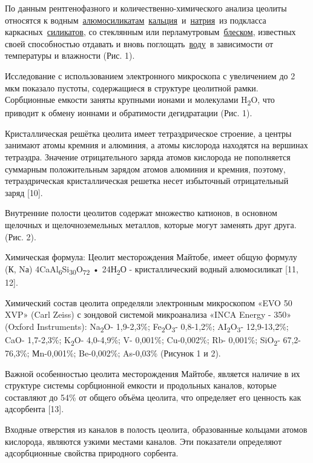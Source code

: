 \begin{multicols}{2}
По данным рентгенофазного и количественно-химического анализа цеолиты
относятся к
водным~\href{https://ru.wikipedia.org/wiki/\%D0\%90\%D0\%BB\%D1\%8E\%D0\%BC\%D0\%BE\%D1\%81\%D0\%B8\%D0\%BB\%D0\%B8\%D0\%BA\%D0\%B0\%D1\%82\%D1\%8B}{алюмосиликатам}~\href{https://ru.wikipedia.org/wiki/\%D0\%9A\%D0\%B0\%D0\%BB\%D1\%8C\%D1\%86\%D0\%B8\%D0\%B9}{кальция}~и~\href{https://ru.wikipedia.org/wiki/\%D0\%9D\%D0\%B0\%D1\%82\%D1\%80\%D0\%B8\%D0\%B9}{натрия}~из
подкласса
каркасных~\href{https://ru.wikipedia.org/wiki/\%D0\%A1\%D0\%B8\%D0\%BB\%D0\%B8\%D0\%BA\%D0\%B0\%D1\%82\%D1\%8B_(\%D0\%BC\%D0\%B8\%D0\%BD\%D0\%B5\%D1\%80\%D0\%B0\%D0\%BB\%D1\%8B)}{силикатов},
со стеклянным или
перламутровым~\href{https://ru.wikipedia.org/wiki/\%D0\%91\%D0\%BB\%D0\%B5\%D1\%81\%D0\%BA}{блеском},
известных своей способностью отдавать и вновь
поглощать~\href{https://ru.wikipedia.org/wiki/\%D0\%92\%D0\%BE\%D0\%B4\%D0\%B0}{воду}~в
зависимости от температуры и влажности (Рис. 1).

Исследование с использованием электронного микроскопа с увеличением до 2
мкм показало пустоты, содержащиеся в структуре цеолитной рамки.
Сорбционные емкости заняты крупными ионами и молекулами
H\textsubscript{2}O, что приводит к обмену ионнами и обратимости
дегидратации (Рис. 1).

Кристаллическая решётка цеолита имеет тетраэдрическое строение, а центры
занимают атомы кремния и алюминия, а атомы кислорода находятся на
вершинах тетраэдра. Значение отрицательного заряда атомов кислорода не
пополняется суммарным положительным зарядом атомов алюминия и кремния,
поэтому, тетраэдрическая кристаллическая решетка несет избыточный
отрицательный заряд {[}10{]}.

Внутренние полости цеолитов содержат множество катионов, в основном
щелочных и щелочноземельных металлов, которые могут заменять друг друга.
(Рис. 2).

Химическая формула: Цеолит месторождения Майтобе, имеет общую формулу
(К, Nа) 4CaAl\textsubscript{6}Si\textsubscript{30}O\textsubscript{72} •
24Н\textsubscript{2}О - кристаллический водный алюмосиликат {[}11,
12{]}.

Химический состав цеолита определяли электронным микроскопом «EVO 50
XVP» (Carl Zeiss) с зондовой системой микроанализа «INCA Energy - 350»
(Oxford Instruments): Na\textsubscript{2}O- 1,9-2,3\%;
Fe\textsubscript{2}O\textsubscript{3}- 0,8-1,2\%;
AI\textsubscript{2}O\textsubscript{3}- 12,9-13,2\%; CaO- 1,7-2,3\%;
K\textsubscript{2}O- 4,0-4,9\%; V- 0,001\%; Cu-0,002\%; Rb- 0,001\%;
SiO\textsubscript{2}- 67,2-76,3\%; Мn-0,001\%; Be-0,002\%; As-0,03\%
(Рисунок 1 и 2).

Важной особенностью цеолита месторождения Майтобе, является наличие в их
структуре системы сорбционной емкости и продольных каналов, которые
составляют до 54\% от общего объёма цеолита, что определяет его ценность
как адсорбента {[}13{]}.

Входные отверстия из каналов в полость цеолита, образованные кольцами
атомов кислорода, являются узкими местами каналов. Эти показатели
определяют адсорбционные свойства природного сорбента.
\end{multicols}

